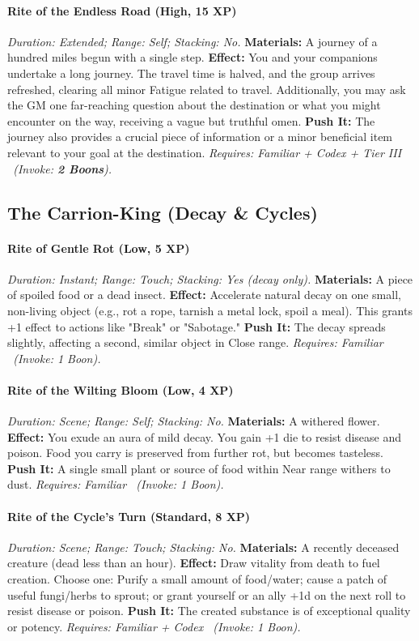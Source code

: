 \documentclass[12pt,twoside]{book}
\begin{document}
\paragraph{Rite of the Endless Road (High, 15 XP)} \emph{Duration: Extended; Range: Self; Stacking: No.}
\textbf{Materials:} A journey of a hundred miles begun with a single step.
\textbf{Effect:} You and your companions undertake a long journey. The travel time is halved, and the group arrives refreshed, clearing all minor Fatigue related to travel. Additionally, you may ask the GM one far-reaching question about the destination or what you might encounter on the way, receiving a vague but truthful omen.
\textbf{Push It:} The journey also provides a crucial piece of information or a minor beneficial item relevant to your goal at the destination.
\emph{Requires: Familiar + Codex + Tier III \ (\textit{Invoke:} \textbf{2 Boons}).}

\subsection{The Carrion-King (Decay \& Cycles)} %
\paragraph{Rite of Gentle Rot (Low, 5 XP)} \emph{Duration: Instant; Range: Touch; Stacking: Yes (decay only).}
\textbf{Materials:} A piece of spoiled food or a dead insect.
\textbf{Effect:} Accelerate natural decay on one small, non-living object (e.g., rot a rope, tarnish a metal lock, spoil a meal). This grants +1 effect to actions like "Break" or "Sabotage."
\textbf{Push It:} The decay spreads slightly, affecting a second, similar object in Close range.
\emph{Requires: Familiar \ (\textit{Invoke:} 1 Boon).}
\paragraph{Rite of the Wilting Bloom (Low, 4 XP)} \emph{Duration: Scene; Range: Self; Stacking: No.}
\textbf{Materials:} A withered flower.
\textbf{Effect:} You exude an aura of mild decay. You gain +1 die to resist disease and poison. Food you carry is preserved from further rot, but becomes tasteless.
\textbf{Push It:} A single small plant or source of food within Near range withers to dust.
\emph{Requires: Familiar \ (\textit{Invoke:} 1 Boon).}
\paragraph{Rite of the Cycle's Turn (Standard, 8 XP)} \emph{Duration: Scene; Range: Touch; Stacking: No.}
\textbf{Materials:} A recently deceased creature (dead less than an hour).
\textbf{Effect:} Draw vitality from death to fuel creation. Choose one: Purify a small amount of food/water; cause a patch of useful fungi/herbs to sprout; or grant yourself or an ally +1d on the next roll to resist disease or poison.
\textbf{Push It:} The created substance is of exceptional quality or potency.
\emph{Requires: Familiar + Codex \ (\textit{Invoke:} 1 Boon).}
\end{document}

